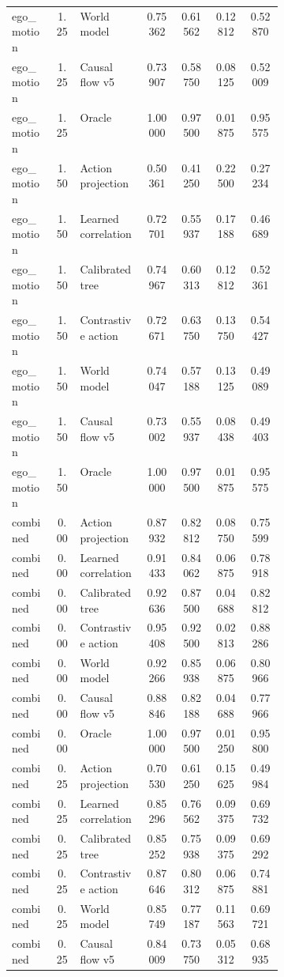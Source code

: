 \documentclass{article}
\begin{document}
\begin{center}
\begin{longtable}{p{0.16\linewidth}cp{0.24\linewidth}cccc}
ego\_motion & 1.25 & World model & 0.75362 & 0.61562 & 0.12812 & 0.52870\\
ego\_motion & 1.25 & Causal flow v5 & 0.73907 & 0.58750 & 0.08125 & 0.52009\\
ego\_motion & 1.25 & Oracle & 1.00000 & 0.97500 & 0.01875 & 0.95575\\
ego\_motion & 1.50 & Action projection & 0.50361 & 0.41250 & 0.22500 & 0.27234\\
ego\_motion & 1.50 & Learned correlation & 0.72701 & 0.55937 & 0.17188 & 0.46689\\
ego\_motion & 1.50 & Calibrated tree & 0.74967 & 0.60313 & 0.12812 & 0.52361\\
ego\_motion & 1.50 & Contrastive action & 0.72671 & 0.63750 & 0.13750 & 0.54427\\
ego\_motion & 1.50 & World model & 0.74047 & 0.57188 & 0.13125 & 0.49089\\
ego\_motion & 1.50 & Causal flow v5 & 0.73002 & 0.55937 & 0.08438 & 0.49403\\
ego\_motion & 1.50 & Oracle & 1.00000 & 0.97500 & 0.01875 & 0.95575\\
combined & 0.00 & Action projection & 0.87932 & 0.82812 & 0.08750 & 0.75599\\
combined & 0.00 & Learned correlation & 0.91433 & 0.84062 & 0.06875 & 0.78918\\
combined & 0.00 & Calibrated tree & 0.92636 & 0.87500 & 0.04688 & 0.82812\\
combined & 0.00 & Contrastive action & 0.95408 & 0.92500 & 0.02813 & 0.88286\\
combined & 0.00 & World model & 0.92266 & 0.85938 & 0.06875 & 0.80966\\
combined & 0.00 & Causal flow v5 & 0.88846 & 0.82188 & 0.04688 & 0.77966\\
combined & 0.00 & Oracle & 1.00000 & 0.97500 & 0.01250 & 0.95800\\
combined & 0.25 & Action projection & 0.70530 & 0.61250 & 0.15625 & 0.49984\\
combined & 0.25 & Learned correlation & 0.85296 & 0.76562 & 0.09375 & 0.69732\\
combined & 0.25 & Calibrated tree & 0.85252 & 0.75938 & 0.09375 & 0.69292\\
combined & 0.25 & Contrastive action & 0.87646 & 0.80312 & 0.06875 & 0.74881\\
combined & 0.25 & World model & 0.85749 & 0.77187 & 0.11563 & 0.69721\\
combined & 0.25 & Causal flow v5 & 0.84009 & 0.73750 & 0.05312 & 0.68935\\

\end{longtable}
\end{center}
\end{document}
